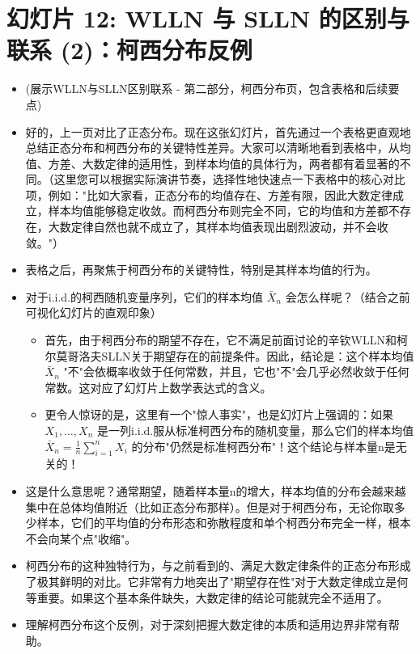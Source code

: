 \documentclass[UTF8]{article} %
\begin{document}
\section*{幻灯片 12: WLLN 与 SLLN 的区别与联系 (2)：柯西分布反例}
\begin{itemize}
    \itemsep1em
    \item (展示WLLN与SLLN区别联系 - 第二部分，柯西分布页，包含表格和后续要点)
    \item 好的，上一页对比了正态分布。现在这张幻灯片，首先通过一个表格更直观地总结正态分布和柯西分布的关键特性差异。大家可以清晰地看到表格中，从均值、方差、大数定律的适用性，到样本均值的具体行为，两者都有着显著的不同。（这里您可以根据实际演讲节奏，选择性地快速点一下表格中的核心对比项，例如："比如大家看，正态分布的均值存在、方差有限，因此大数定律成立，样本均值能够稳定收敛。而柯西分布则完全不同，它的均值和方差都不存在，大数定律自然也就不成立了，其样本均值表现出剧烈波动，并不会收敛。"）
    \item 表格之后，再聚焦于柯西分布的关键特性，特别是其样本均值的行为。
    \item 对于i.i.d.的柯西随机变量序列，它们的样本均值 $\bar{X}_n$ 会怎么样呢？（结合之前可视化幻灯片的直观印象）
    \begin{itemize}[label=\textbullet, itemsep=0.3em]
        \item 首先，由于柯西分布的期望不存在，它不满足前面讨论的辛钦WLLN和柯尔莫哥洛夫SLLN关于期望存在的前提条件。因此，结论是：这个样本均值 $\bar{X}_n$ "不"会依概率收敛于任何常数，并且，它也"不"会几乎必然收敛于任何常数。这对应了幻灯片上数学表达式的含义。
        \item 更令人惊讶的是，这里有一个"惊人事实"，也是幻灯片上强调的：如果 $X_1, \dots, X_n$ 是一列i.i.d.服从标准柯西分布的随机变量，那么它们的样本均值 $\bar{X}_n = \frac{1}{n} \sum_{i=1}^n X_i$ 的分布"仍然是标准柯西分布"！这个结论与样本量n是无关的！
    \end{itemize}
    \item 这是什么意思呢？通常期望，随着样本量n的增大，样本均值的分布会越来越集中在总体均值附近（比如正态分布那样）。但是对于柯西分布，无论你取多少样本，它们的平均值的分布形态和弥散程度和单个柯西分布完全一样，根本不会向某个点"收缩"。
    \item 柯西分布的这种独特行为，与之前看到的、满足大数定律条件的正态分布形成了极其鲜明的对比。它非常有力地突出了"期望存在性"对于大数定律成立是何等重要。如果这个基本条件缺失，大数定律的结论可能就完全不适用了。
    \item 理解柯西分布这个反例，对于深刻把握大数定律的本质和适用边界非常有帮助。
\end{itemize}
\end{document}
